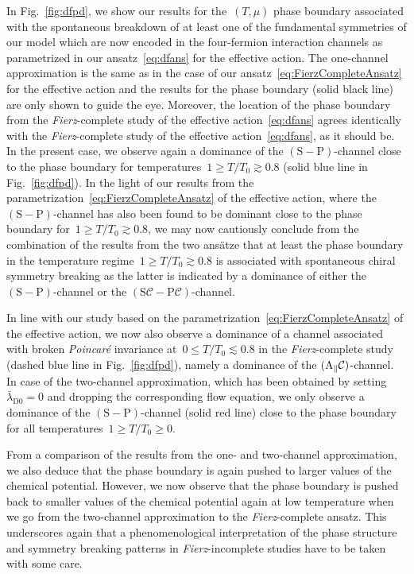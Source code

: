 \documentclass[prd,english,preprintnumbers,amsmath,amssymb,nofootinbib,twocolumn,superscriptaddress]{revtex4-1}
\def\CC{{\mathcal C}}
\begin{document}
{{In Fig.~\ref{fig:dfpd}, we show our results for the~$(T,\mu)$ phase boundary 
associated with the spontaneous breakdown of at least one of the fundamental symmetries of our model which are 
now encoded in the four-fermion interaction channels
as parametrized in our ansatz~\eqref{eq:dfans} for the effective action. The one-channel approximation is the same
as in the {case of our ansatz~\eqref{eq:FierzCompleteAnsatz} for} the effective action and the results for the phase boundary (solid black line) 
are only shown to guide the eye. Moreover, the location 
of the phase boundary from the {\it Fierz}-complete study of the effective action~\eqref{eq:dfans}
agrees identically with the {\it Fierz}-complete study of the effective action~\eqref{eq:dfans}, as it should be.
{In the present case, we observe again a dominance of the $(\text{S} - \text{P})$-channel 
close to the phase boundary 
for {temperatures~$1 \geq T/T_0 \gtrsim 0.8$ (solid blue line in Fig.~\ref{fig:dfpd})}.
In the light of our results from the parametrization~\eqref{eq:FierzCompleteAnsatz} of 
the effective action, where the $(\text{S}-\text{P})$-channel has also been found to be dominant close to the phase boundary
for~$1 \geq T/T_0 \gtrsim 0.8$, 
we may now cautiously conclude from the combination of the results from the two ans\"atze
that at least the phase boundary in the temperature regime~$1 \geq T/T_0 \gtrsim 0.8$ is}
associated with spontaneous chiral symmetry breaking as the latter is indicated by 
a dominance of either the $\left(\text{S} - \text{P} \right)$-channel
or the $( \text{S} \CC - \text{P} \CC)$-channel.

{In line with our study based on the parametrization~\eqref{eq:FierzCompleteAnsatz} of 
the effective action, we now also observe a dominance of a channel associated with broken {\it Poincar\'{e}}
invariance at~$0\leq T/T_0\lesssim 0.8$ in} the {\it Fierz}-complete study (dashed blue line in Fig.~\ref{fig:dfpd}),
namely a dominance of the $( \text A _\parallel \CC )$-channel. 
In case of the two-channel approximation, which has been obtained by setting~$\bar{\lambda}_{\text{D0}}=0$ and dropping the 
corresponding flow equation, {we only observe a dominance of the 
$(\text{S}-\text{P})$-channel (solid red line) close to the phase boundary for all temperatures~$1\geq T/T_0 \geq 0$.}

From a comparison of the results from the one- and two-channel 
approximation, we also deduce that the phase boundary
is again pushed to larger values of the chemical potential. However, we now observe that the phase boundary is 
pushed back to smaller values of the chemical potential again {at low temperature} when we go from the two-channel approximation
to the {\it Fierz}-complete ansatz. This underscores again that a phenomenological interpretation of the phase structure and
symmetry breaking patterns in {\it Fierz}-incomplete studies have to be taken with some care.

}}
\end{document}
